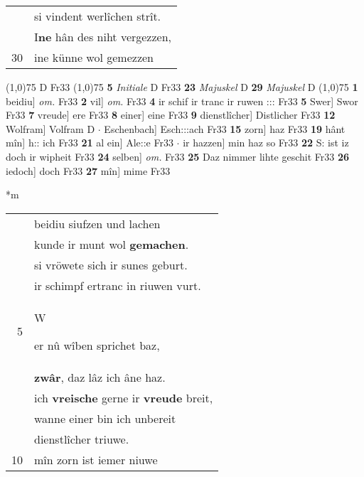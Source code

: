 \documentclass[8pt,a4paper,notitlepage]{article}
\begin{document}
\begin{table}[ht]
\begin{minipage}[t]{0.5\linewidth}
\begin{tabular}{rl}
 & si vindent werlîchen strît.\\ 
 & I\textbf{ne} hân des niht vergezzen,\\ 
30 & ine künne wol gemezzen\\ 
\end{tabular}
\scriptsize
\line(1,0){75} \newline
D Fr33 \newline
\line(1,0){75} \newline
\textbf{5} \textit{Initiale} D Fr33  \textbf{23} \textit{Majuskel} D  \textbf{29} \textit{Majuskel} D  \newline
\line(1,0){75} \newline
\textbf{1} beidiu] \textit{om.} Fr33 \textbf{2} vil] \textit{om.} Fr33 \textbf{4} ir schif ir tranc ir ruwen ::: Fr33 \textbf{5} Swer] Swor Fr33 \textbf{7} vreude] ere Fr33 \textbf{8} einer] eine Fr33 \textbf{9} dienstlîcher] Distlicher Fr33 \textbf{12} Wolfram] Volfram D  $\cdot$ Eschenbach] Esch:::ach Fr33 \textbf{15} zorn] haz Fr33 \textbf{19} hânt mîn] h:: ich Fr33 \textbf{21} al ein] Ale::e Fr33  $\cdot$ ir hazzen] min haz so Fr33 \textbf{22} S: ist iz doch ir wipheit Fr33 \textbf{24} selben] \textit{om.} Fr33 \textbf{25} Daz nimmer lihte geschit Fr33 \textbf{26} iedoch] doch Fr33 \textbf{27} mîn] mime Fr33 \newline
\end{minipage}
\hspace{0.5cm}
\begin{minipage}[t]{0.5\linewidth}
\small
\begin{center}*m
\end{center}
\begin{tabular}{rl}
 & beidiu siufzen und lachen\\ 
 & kunde ir munt wol \textbf{gemachen}.\\ 
 & si vröwete sich ir sunes geburt.\\ 
 & ir schimpf ertranc in riuwen vurt.\\ 
5 & \begin{large}W\end{large}er nû wîben sprichet baz,\\ 
 & \textbf{zwâr}, daz lâz ich âne haz.\\ 
 & ich \textbf{vreische} gerne ir \textbf{vreude} breit,\\ 
 & wanne einer bin ich unbereit\\ 
 & dienstlîcher triuwe.\\ 
10 & mîn zorn ist iemer niuwe\\ 

\end{tabular}
\end{minipage}
\end{table}
\end{document}
